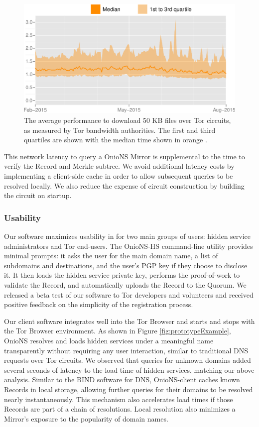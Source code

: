 \documentclass[USenglish,oneside,twocolumn]{article}
\begin{document}
\begin{figure}[h]
	\centering
	\includegraphics[width=\linewidth]{../assets/images/torperf_50kb_2015-02_2015-08.eps}
	\caption{The average performance to download 50 KB files over Tor circuits, as measured by Tor bandwidth authorities. The first and third quartiles are shown with the median time shown in orange \cite{TorMetrics}.}
	\label{fig:latencyGraph}
\end{figure}

This network latency to query a OnioNS Mirror is supplemental to the time to verify the Record and Merkle subtree. We avoid additional latency costs by implementing a client-side cache in order to allow subsequent queries to be resolved locally. We also reduce the expense of circuit construction by building the circuit on startup.

\subsubsection{Usability} %

Our software maximizes usability in for two main groups of users: hidden service administrators and Tor end-users. The OnioNS-HS command-line utility provides minimal prompts: it asks the user for the main domain name, a list of subdomains and destinations, and the user's PGP key if they choose to disclose it. It then loads the hidden service private key, performs the proof-of-work to validate the Record, and automatically uploads the Record to the Quorum. We released a beta test of our software to Tor developers and volunteers and received positive feedback on the simplicity of the registration process.

Our client software integrates well into the Tor Browser and starts and stops with the Tor Browser environment. As shown in Figure \ref{fig:prototypeExample}, OnioNS resolves and loads hidden services under a meaningful name transparently without requiring any user interaction, similar to traditional DNS requests over Tor circuits. We observed that queries for unknown domains added several seconds of latency to the load time of hidden services, matching our above analysis. Similar to the BIND software for DNS, OnioNS-client caches known Records in local storage, allowing further queries for their domains to be resolved nearly instantaneously. This mechanism also accelerates load times if those Records are part of a chain of resolutions. Local resolution also minimizes a Mirror's exposure to the popularity of domain names.
\end{document}
